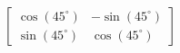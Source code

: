 \documentclass[preview]{standalone}
\begin{document}
\begin{align*}
\begin{bmatrix} \cos(45^\circ) & -\sin(45^\circ) \\ \sin(45^\circ) & \cos(45^\circ) \end{bmatrix}
\end{align*}
\end{document}
